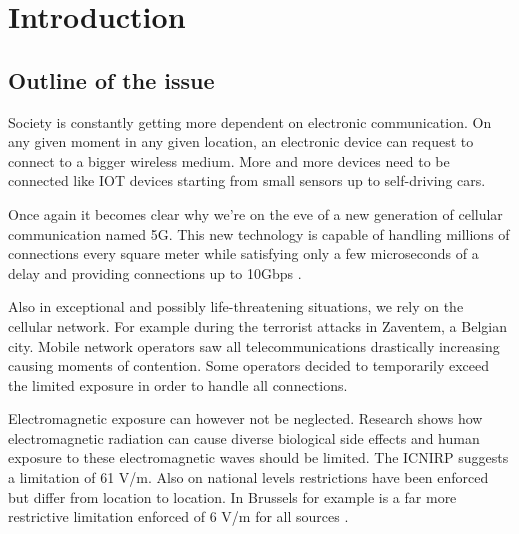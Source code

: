 %

\chapter{Introduction}
\label{chap:intro}

\section{Outline of the issue}
\label{sec:issue}

Society is constantly getting more dependent on electronic communication. On any given moment in any given location, an electronic device
can request to connect to a bigger wireless medium. More and more devices need to be connected like IOT devices starting from small sensors up to self-driving cars.

Once again it becomes clear why we're on the eve of a new generation of cellular communication named 5G. 
This new technology is capable of handling millions of connections every square meter %
while satisfying only a few microseconds of a delay and providing connections up to 10Gbps \cite{5GFeatures}.

Also in exceptional and possibly life-threatening situations, we rely on the cellular network. For example during the terrorist attacks in Zaventem, a Belgian city.
Mobile network operators saw all telecommunications drastically increasing causing moments of contention. Some operators decided to temporarily exceed the limited exposure in
order to handle all connections. \cite{baseZaventem}

Electromagnetic exposure can however not be neglected. Research shows how electromagnetic radiation can cause diverse biological side effects \cite{bioeffects} and human exposure to these electromagnetic waves should be limited. The \gls{ICNIRP} 
suggests a limitation of 61 V/m. Also on national levels restrictions have been enforced but differ from location to location. In Brussels for example is a far more restrictive limitation enforced of 6 V/m for all sources \cite{J1, J5}.
